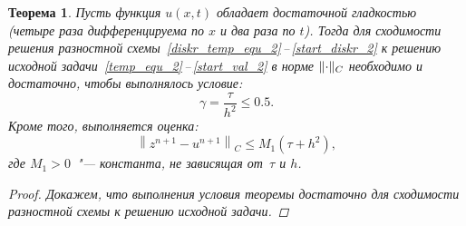 \documentclass[11pt,a4paper,twoside]{report}
\numberwithin{equation}{section}
\theoremstyle{definition}
\theoremstyle{plain}
\newtheorem*{theorem*}{Теорема}
\DeclarePairedDelimiter\norm{\lVert}{\rVert}
\begin{document}
\begin{theorem*}
%
    Пусть функция $u(x, t)$ обладает достаточной гладкостью (четыре раза дифференцируема
    по $x$ и два раза по $t$). Тогда для сходимости решения разностной
    схемы~\eqref{diskr_temp_equ_2}\,--\,\eqref{start_diskr_2} к решению
    исходной задачи~\eqref{temp_equ_2}\,--\,\eqref{start_val_2} в норме
    $\norm{\cdot}_C$ необходимо и достаточно, чтобы выполнялось условие:
    $$
        \gamma = \frac{\tau}{h^2} \leqslant 0.5.
    $$
    Кроме того, выполняется оценка:
    $$
        \left\|z^{n+1}-u^{n+1}\right\|_C \leqslant M_1\left(\tau+h^2\right),
    $$
    где $M_1 > 0$~"--- константа, не зависящая от~$\tau$ и $h$.

    \begin{proof}
        Докажем, что выполнения условия теоремы достаточно для сходимости
        разностной схемы к решению исходной задачи.


\end{proof}
\end{theorem*}
\end{document}
